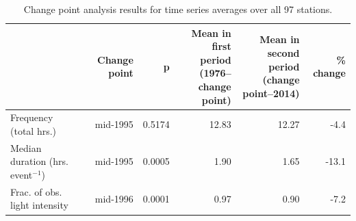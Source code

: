 \documentclass[twocol]{ametsoc}
\begin{document}




\begin{table}[]
\caption{\label{table:changepoints} Change point analysis results for time series averages over all 97 stations.}
\begin{tabular}{@{}lrrrrr@{}}
\toprule
 & Change point & p & \makecell{Mean in first period \\ (1976--change point)} & \makecell{Mean in second period \\ (change point--2014)} & \% change \\ \midrule
Frequency (total hrs.) & mid-1995 & 0.5174 & 12.83 & 12.27 & -4.4 \\
Median duration (hrs. event$^{-1}$) & mid-1995 & 0.0005 & 1.90 & 1.65 & -13.1 \\
Frac. of obs. light intensity & mid-1996 & 0.0001 & 0.97 & 0.90 & -7.2 \\ \bottomrule
\end{tabular}
\end{table}
\end{document}
